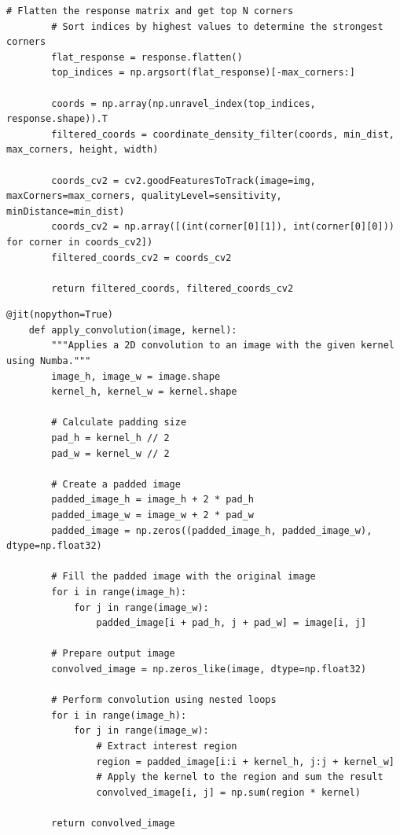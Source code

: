 \documentclass[11pt, conference, letterpaper]{IEEEtran}
\begin{document}
\begin{lstlisting}[style=python, caption={Shi-Tomasi Corners Function}, label={lst:shi-tomasi}]
        # Flatten the response matrix and get top N corners
        # Sort indices by highest values to determine the strongest corners
        flat_response = response.flatten()
        top_indices = np.argsort(flat_response)[-max_corners:]

        coords = np.array(np.unravel_index(top_indices, response.shape)).T
        filtered_coords = coordinate_density_filter(coords, min_dist, max_corners, height, width)

        coords_cv2 = cv2.goodFeaturesToTrack(image=img, maxCorners=max_corners, qualityLevel=sensitivity, minDistance=min_dist)
        coords_cv2 = np.array([(int(corner[0][1]), int(corner[0][0])) for corner in coords_cv2])
        filtered_coords_cv2 = coords_cv2
        
        return filtered_coords, filtered_coords_cv2
\end{lstlisting}

\begin{lstlisting}[style=python, caption={2-Dimensional Convolution Routine}, label={lst:convolution}]
    @jit(nopython=True)
    def apply_convolution(image, kernel):
        """Applies a 2D convolution to an image with the given kernel using Numba."""
        image_h, image_w = image.shape
        kernel_h, kernel_w = kernel.shape
        
        # Calculate padding size
        pad_h = kernel_h // 2
        pad_w = kernel_w // 2
        
        # Create a padded image
        padded_image_h = image_h + 2 * pad_h
        padded_image_w = image_w + 2 * pad_w
        padded_image = np.zeros((padded_image_h, padded_image_w), dtype=np.float32)
    
        # Fill the padded image with the original image
        for i in range(image_h):
            for j in range(image_w):
                padded_image[i + pad_h, j + pad_w] = image[i, j]
    
        # Prepare output image
        convolved_image = np.zeros_like(image, dtype=np.float32)
    
        # Perform convolution using nested loops
        for i in range(image_h):
            for j in range(image_w):
                # Extract interest region
                region = padded_image[i:i + kernel_h, j:j + kernel_w]
                # Apply the kernel to the region and sum the result
                convolved_image[i, j] = np.sum(region * kernel)
        
        return convolved_image
\end{lstlisting}
\end{document}
